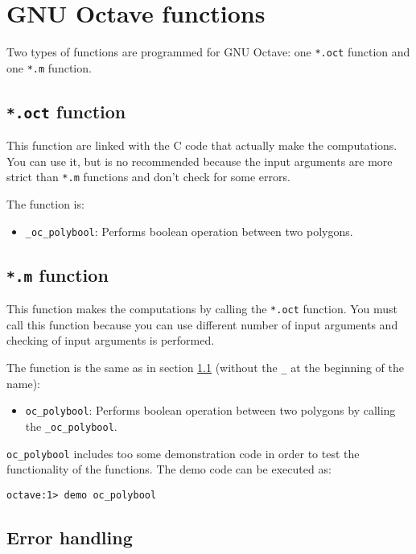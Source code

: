 \documentclass[10pt,a4paper]{article}
\newcommand{\octave}{GNU Octave}
\begin{document}
\section{\octave{} functions}

Two types of functions are programmed for \octave: one \texttt{*.oct} function
and one \texttt{*.m} function.

\subsection{\texttt{*.oct} function}
\label{op-of}

This function are linked with the C code that actually make the computations.
You can use it, but is no recommended because the input arguments are more
strict than \texttt{*.m} functions and don't check for some errors.

The function is:
\begin{itemize}
\item \texttt{\_oc\_polybool}: Performs boolean operation between two polygons.
\end{itemize}

\subsection{\texttt{*.m} function}

This function makes the computations by calling the \texttt{*.oct} function. You
must call this function because you can use different number of input arguments
and checking of input arguments is performed.

The function is the same as in section \ref{op-of} (without the \texttt{\_} at
the beginning of the name):
\begin{itemize}
\item \texttt{oc\_polybool}: Performs boolean operation between two polygons
      by calling the \texttt{\_oc\_polybool}.
\end{itemize}

\texttt{oc\_polybool} includes too some demonstration code in order to test the
functionality of the functions. The demo code can be executed as:
\begin{verbatim}
octave:1> demo oc_polybool
\end{verbatim}

\subsection{Error handling}
\end{document}
